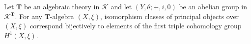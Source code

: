 Let $\mathbf{T}$ be an algebraic theory in $\mathcal{K}$ and let $(Y, \theta; +, i, 0)$ be an abelian group in $\mathcal{K}^{\mathbf{T}}$. For any $\mathbf{T}$-algebra $(X, \xi)$, isomorphism classes of principal objects over $(X, \xi)$ correspond bijectively to elements of the first triple cohomology group $H^1(X, \xi)$.
